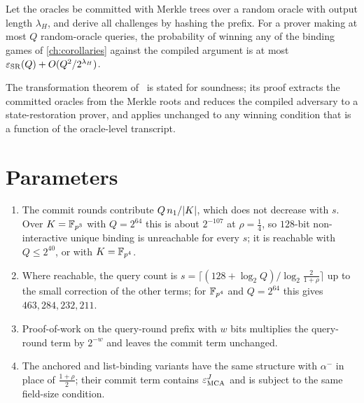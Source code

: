 \begin{theorem}\label{thm:bcs}
Let the oracles be committed with Merkle trees over a random oracle with output length
$\lambda_H$, and derive all challenges by hashing the prefix. For a prover making at most
$Q$ random-oracle queries, the probability of winning any of the binding games of
\cref{ch:corollaries} against the compiled argument is at most
$\varepsilon_{\mathrm{SR}}(Q)+O(Q^2/2^{\lambda_H})$.
\end{theorem}

The transformation theorem of~\cite{BCS16} is stated for soundness; its proof extracts
the committed oracles from the Merkle roots and reduces the compiled adversary to a
state-restoration prover, and applies unchanged to any winning condition that is a
function of the oracle-level transcript.

\section{Parameters}



\begin{remark}\label{rem:fs-reading}
\begin{enumerate}[label=\textup{(\roman*)}]
\item The commit rounds contribute $Q\,n_1/|K|$, which does not decrease with $s$. Over
$K=\mathbb{F}_{p^3}$ with $Q=2^{64}$ this is about $2^{-107}$ at $\rho=\frac14$, so $128$-bit
non-interactive unique binding is unreachable for every $s$; it is reachable with
$Q\le2^{40}$, or with $K=\mathbb{F}_{p^4}$.
\item Where reachable, the query count is
$s=\lceil(128+\log_2Q)/\log_2\frac2{1+\rho}\rceil$ up to the small correction of the other
terms; for $\mathbb{F}_{p^4}$ and $Q=2^{64}$ this gives $463,284,232,211$.
\item Proof-of-work on the query-round prefix with $w$ bits multiplies the query-round term
by $2^{-w}$ and leaves the commit term unchanged.
\item The anchored and list-binding variants have the same structure with $\alpha^-$ in
place of $\frac{1+\rho}2$; their commit term contains $\varepsilon^J_{\mathrm{MCA}}$ and is subject to the
same field-size condition.
\end{enumerate}
\end{remark}
